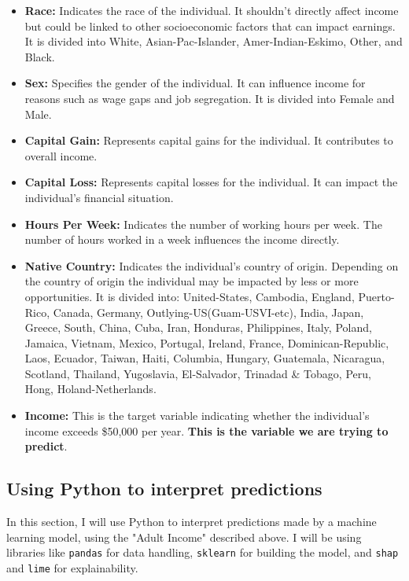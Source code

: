 \documentclass[10pt,journal,compsoc]{IEEEtran}
\begin{document}
\begin{itemize}
    \item \textbf{Race:} Indicates the race of the individual. It shouldn't directly affect income but could be linked to other socioeconomic factors that can impact earnings. It is divided into White, Asian-Pac-Islander, Amer-Indian-Eskimo, Other, and Black.

    \item \textbf{Sex:} Specifies the gender of the individual. It can influence income for reasons such as wage gaps and job segregation. It is divided into Female and Male.

    \item \textbf{Capital Gain:} Represents capital gains for the individual. It contributes to overall income.

    \item \textbf{Capital Loss:} Represents capital losses for the individual. It can impact the individual's financial situation.

    \item \textbf{Hours Per Week:} Indicates the number of working hours per week. The number of hours worked in a week influences the income directly.

    \item \textbf{Native Country:} Indicates the individual's country of origin. Depending on the country of origin the individual may be impacted by less or more opportunities. It is divided into: United-States, Cambodia, England, Puerto-Rico, Canada, Germany, Outlying-US(Guam-USVI-etc), India, Japan, Greece, South, China, Cuba, Iran, Honduras, Philippines, Italy, Poland, Jamaica, Vietnam, Mexico, Portugal, Ireland, France, Dominican-Republic, Laos, Ecuador, Taiwan, Haiti, Columbia, Hungary, Guatemala, Nicaragua, Scotland, Thailand, Yugoslavia, El-Salvador, Trinadad \& Tobago, Peru, Hong, Holand-Netherlands.

    \item \textbf{Income:} This is the target variable indicating whether the individual's income exceeds  \$50,000 per year. \textbf{This is the variable we are trying to predict}.

\end{itemize}

\subsection{Using Python to interpret predictions}
In this section, I will use Python to interpret predictions made by a machine learning model, using the "Adult Income" described above. I will be using libraries like \texttt{pandas} for data handling, \texttt{sklearn} for building the model, and \texttt{shap} and \texttt{lime} for explainability.
\end{document}
